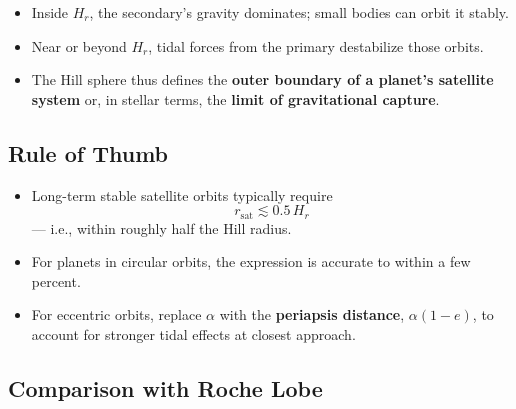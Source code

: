\documentclass[
  letterpaper,
]{book}
\providecommand{\tightlist}{%
  \setlength{\itemsep}{0pt}\setlength{\parskip}{0pt}}
\begin{document}
\begin{itemize}
\tightlist
\item
  Inside \(H_r\), the secondary's gravity dominates; small bodies can
  orbit it stably.\\
\item
  Near or beyond \(H_r\), tidal forces from the primary destabilize
  those orbits.\\
\item
  The Hill sphere thus defines the \textbf{outer boundary of a planet's
  satellite system} or, in stellar terms, the \textbf{limit of
  gravitational capture}.
\end{itemize}

\subsection{Rule of Thumb}\label{rule-of-thumb}

\begin{itemize}
\item
  Long-term stable satellite orbits typically require\\
  \[
  r_{\text{sat}} \lesssim 0.5\,H_r
  \] --- i.e., within roughly half the Hill radius.
\item
  For planets in circular orbits, the expression is accurate to within a
  few percent.
\item
  For eccentric orbits, replace \(\alpha\) with the \textbf{periapsis
  distance}, \(\alpha(1 - e)\), to account for stronger tidal effects at
  closest approach.
\end{itemize}

\subsection{Comparison with Roche
Lobe}\label{comparison-with-roche-lobe}
\end{document}
